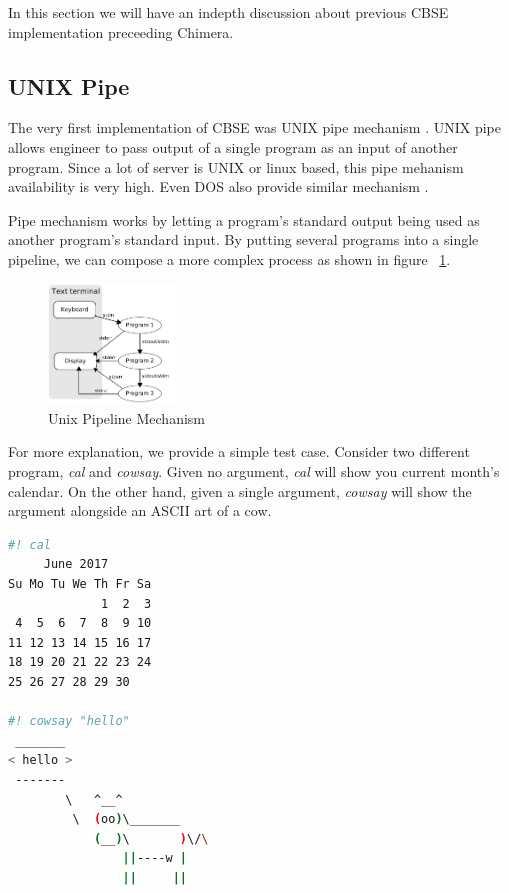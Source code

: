 \documentclass[conference]{IEEEtran}
\begin{document}
In this section we will have an indepth discussion about previous CBSE implementation 
preceeding Chimera.


\subsection{UNIX Pipe}

The very first implementation of CBSE was UNIX pipe mechanism \cite{mcilroy1968mass}. 
UNIX pipe allows engineer to pass output of a single program as an input of 
another program. Since a lot of server is UNIX or linux based, this pipe 
mehanism availability is very high. Even DOS also provide similar mechanism 
\cite{dos7command}.

Pipe mechanism works by letting a program's standard output being used as another
program's standard input. By putting several programs into a single pipeline, we can
compose a more complex process as shown in figure ~\ref{fig:unixPipe}.

\begin{figure}
	\centering
	\includegraphics[width=0.3\textwidth]
		{images/Pipeline.jpg}
	\caption{Unix Pipeline Mechanism}
	\label{fig:unixPipe}
\end{figure}

For more explanation, we provide a simple test case. Consider two different program,
{\it cal} and {\it cowsay}. Given no argument, {\it cal} will show you current month's
calendar. On the other hand, given a single argument, {\it cowsay} will show the 
argument alongside an ASCII art of a cow.

\begin{lstlisting}[caption=cal and cowsay, label=calAndCowsay, language=bash, basicstyle=\small, breaklines=true]
#! cal
     June 2017        
Su Mo Tu We Th Fr Sa  
             1  2  3  
 4  5  6  7  8  9 10  
11 12 13 14 15 16 17  
18 19 20 21 22 23 24  
25 26 27 28 29 30     
                      
#! cowsay "hello"
 _______
< hello >
 -------
        \   ^__^
         \  (oo)\_______
            (__)\       )\/\
                ||----w |
                ||     ||
\end{lstlisting}
\end{document}
